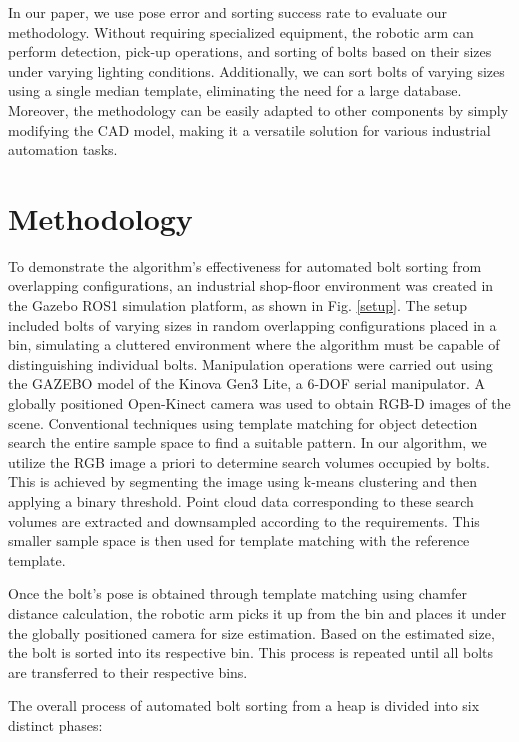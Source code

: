 \documentclass[conference]{IEEEtran}
\begin{document}
In our paper, we use pose error and sorting success rate to evaluate our methodology. Without requiring specialized equipment, the robotic arm can perform detection, pick-up operations, and sorting of bolts based on their sizes under varying lighting conditions. Additionally, we can sort bolts of varying sizes using a single median template, eliminating the need for a large database. Moreover, the methodology can be easily adapted to other components by simply modifying the CAD model, making it a versatile solution for various industrial automation tasks.

\section{Methodology}
To demonstrate the algorithm's effectiveness for automated bolt sorting from overlapping configurations,
 an industrial shop-floor environment was created in the Gazebo ROS1 simulation platform, as shown in Fig. \ref{setup}. The setup included bolts of varying sizes in random overlapping configurations placed in a bin, simulating a cluttered environment where the algorithm must be capable of distinguishing individual bolts. Manipulation operations were carried out using the GAZEBO model of the Kinova Gen3 Lite, a 6-DOF serial manipulator. A globally positioned Open-Kinect camera was used to obtain RGB-D images of the scene. Conventional techniques using template matching for object detection search the entire sample space to find a suitable pattern.
 In our algorithm, we utilize the RGB image a priori to determine search volumes occupied by bolts. This is achieved by segmenting the image using k-means clustering and then applying a binary threshold.
 Point cloud data corresponding to these search volumes are extracted and downsampled according to the requirements. This smaller sample space is then used for template matching with the reference template.

 Once the bolt's pose is obtained through template matching using chamfer distance calculation, the robotic arm picks it up from the bin and places it under the globally positioned camera for size estimation. Based on the estimated size, the bolt is sorted into its respective bin. This process is repeated until all bolts are transferred to their respective bins.

The overall process of automated bolt sorting from a heap is divided into six distinct phases:
\end{document}
